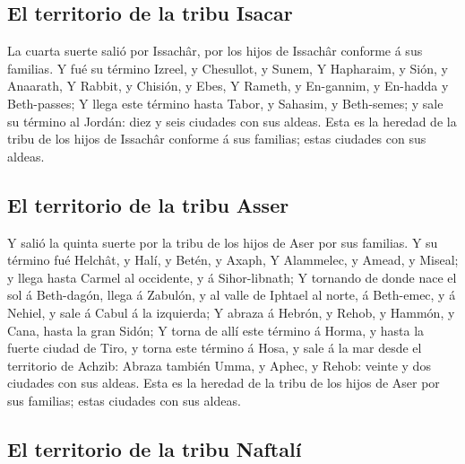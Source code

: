 \hypertarget{el-territorio-de-la-tribu-isacar}{%
\subsection{El territorio de la tribu
Isacar}\label{el-territorio-de-la-tribu-isacar}}

 La cuarta suerte salió por Issachâr, por los hijos de
Issachâr conforme á sus familias.  Y fué su término Izreel,
y Chesullot, y Sunem,  Y Hapharaim, y Sión, y Anaarath,
 Y Rabbit, y Chisión, y Ebes,  Y Rameth, y
En-gannim, y En-hadda y Beth-passes;  Y llega este término
hasta Tabor, y Sahasim, y Beth-semes; y sale su término al Jordán: diez
y seis ciudades con sus aldeas.  Esta es la heredad de la
tribu de los hijos de Issachâr conforme á sus familias; estas ciudades
con sus aldeas.

\hypertarget{el-territorio-de-la-tribu-asser}{%
\subsection{El territorio de la tribu
Asser}\label{el-territorio-de-la-tribu-asser}}

 Y salió la quinta suerte por la tribu de los hijos de Aser
por sus familias.  Y su término fué Helchât, y Halí, y
Betén, y Axaph,  Y Alammelec, y Amead, y Miseal; y llega
hasta Carmel al occidente, y á Sihor-libnath;  Y tornando
de donde nace el sol á Beth-dagón, llega á Zabulón, y al valle de
Iphtael al norte, á Beth-emec, y á Nehiel, y sale á Cabul á la
izquierda;  Y abraza á Hebrón, y Rehob, y Hammón, y Cana,
hasta la gran Sidón;  Y torna de allí este término á Horma,
y hasta la fuerte ciudad de Tiro, y torna este término á Hosa, y sale á
la mar desde el territorio de Achzib:  Abraza también Umma,
y Aphec, y Rehob: veinte y dos ciudades con sus aldeas. 
Esta es la heredad de la tribu de los hijos de Aser por sus familias;
estas ciudades con sus aldeas.

\hypertarget{el-territorio-de-la-tribu-naftaluxed}{%
\subsection{El territorio de la tribu
Naftalí}\label{el-territorio-de-la-tribu-naftaluxed}}

